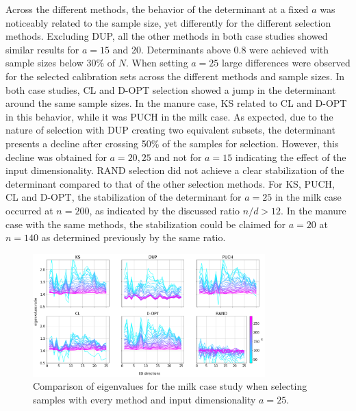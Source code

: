 \documentclass[preprint,12pt]{elsarticle}
\begin{document}
Across the different methods, the behavior of the determinant at a fixed $a$ was noticeably related to the sample size, yet differently for the different selection methods. Excluding DUP, all the other methods in both case studies showed similar results for $a=15$ and 20. Determinants above 0.8 were achieved with sample sizes below 30\% of $N$. When setting $a=25$ large differences were observed for the selected calibration sets across the different methods and sample sizes. In both case studies, CL and D-OPT selection showed a jump in the determinant around the same sample sizes. In the manure case, KS related to CL and D-OPT in this behavior, while it was PUCH in the milk case. As expected, due to the nature of selection with DUP creating two equivalent subsets, the determinant presents a decline after crossing 50\% of the samples for selection. However, this decline was obtained for $a=20, 25$ and not for $a=15$ indicating the effect of the input dimensionality. RAND selection did not achieve a clear stabilization of the determinant compared to that of the other selection methods. For KS, PUCH, CL and D-OPT, the stabilization of the determinant for $a=25$ in the milk case occurred at $n=200$, as indicated by the discussed ratio $n/d>12$. In the manure case with the same methods, the stabilization could be claimed for $a=20$ at $n=140$ as determined previously by the same ratio. 

\begin{figure}[H]
\includegraphics[width=0.8\textwidth]{manuscript/figures/d01_milk_specific_framework_eigenvalsratio.png}
\centering
\caption{Comparison of eigenvalues for the milk case study when selecting samples with every method and input dimensionality $a=25$.}
\label{fig_d01_milk_specific_framework_eigenvalsratio}
\end{figure}
\end{document}
